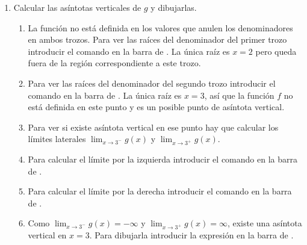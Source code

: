 \begin{enumerate}[leftmargin=*]
\begin{enumerate}
      \item Calcular las asíntotas verticales de $g$ y dibujarlas.
            \begin{indication}
            \begin{enumerate}
            \item La función no está definida en los valores que anulen los denominadores en ambos trozos.
                  Para ver las raíces del denominador del primer trozo introducir el comando  en la barra de .
                  La única raíz es $x=2$ pero queda fuera de la región correspondiente a este trozo.
            \item Para ver las raíces del denominador del segundo trozo introducir el comando  en la barra de .
                  La única raíz es $x=3$, así que la función $f$ no está definida en este punto y es un posible punto de asíntota vertical.
            \item Para ver si existe asíntota vertical en ese punto hay que calcular los límites laterales $\lim_{x\rightarrow 3^-}g(x)$ y $\lim_{x\rightarrow 3^+}g(x)$.
            \item Para calcular el límite por la izquierda introducir el comando  en la barra de .
            \item Para calcular el límite por la derecha introducir el comando  en la barra de .
            \item Como $\lim_{x\rightarrow 3^-}g(x)=-\infty$ y $\lim_{x\rightarrow 3^+}g(x)=\infty$, existe una asíntota vertical en $x=3$.
                  Para dibujarla introducir la expresión  en la barra de .
            \end{enumerate}
            \end{indication}


\end{enumerate}
\end{enumerate}
